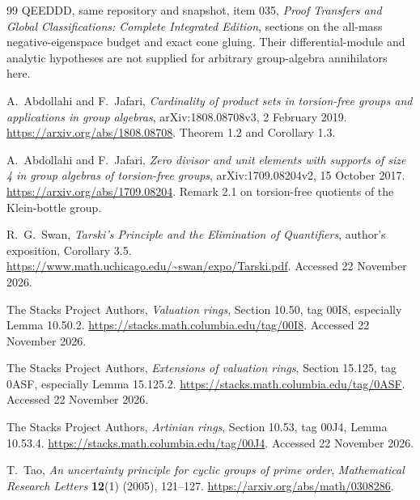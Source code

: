 \documentclass[11pt,a4paper,oneside]{report}
\theoremstyle{definition}
\theoremstyle{remark}
\begin{document}
\begin{thebibliography}{99}
QEEDDD, same repository and snapshot, item 035,
\emph{Proof Transfers and Global Classifications: Complete Integrated
Edition}, sections on the all-mass negative-eigenspace budget and
exact cone gluing. Their differential-module and analytic hypotheses
are not supplied for arbitrary group-algebra annihilators here.

A.~Abdollahi and F.~Jafari,
\emph{Cardinality of product sets in torsion-free groups and
applications in group algebras},
arXiv:1808.08708v3, 2 February 2019.
\url{https://arxiv.org/abs/1808.08708}.
Theorem 1.2 and Corollary 1.3.

A.~Abdollahi and F.~Jafari,
\emph{Zero divisor and unit elements with supports of size 4 in
group algebras of torsion-free groups},
arXiv:1709.08204v2, 15 October 2017.
\url{https://arxiv.org/abs/1709.08204}.
Remark 2.1 on torsion-free quotients of the Klein-bottle group.

R.~G.~Swan,
\emph{Tarski's Principle and the Elimination of Quantifiers},
author's exposition, Corollary 3.5.
\url{https://www.math.uchicago.edu/~swan/expo/Tarski.pdf}.
Accessed 22 November 2026.

The Stacks Project Authors, \emph{Valuation rings},
Section 10.50, tag 00I8, especially Lemma 10.50.2.
\url{https://stacks.math.columbia.edu/tag/00I8}.
Accessed 22 November 2026.

The Stacks Project Authors, \emph{Extensions of valuation rings},
Section 15.125, tag 0ASF, especially Lemma 15.125.2.
\url{https://stacks.math.columbia.edu/tag/0ASF}.
Accessed 22 November 2026.

The Stacks Project Authors, \emph{Artinian rings},
Section 10.53, tag 00J4, Lemma 10.53.4.
\url{https://stacks.math.columbia.edu/tag/00J4}.
Accessed 22 November 2026.

T.~Tao, \emph{An uncertainty principle for cyclic groups of prime order},
\emph{Mathematical Research Letters} \textbf{12}(1) (2005), 121--127.
\url{https://arxiv.org/abs/math/0308286}.
\end{thebibliography}
\end{document}
